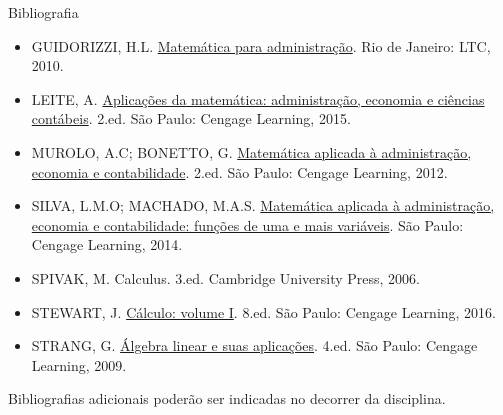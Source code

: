 \documentclass[10pt]{beamer}
\begin{document}
\begin{frame}{Bibliografia }
    \begin{itemize}
        \item GUIDORIZZI, H.L. \href{https://app.minhabiblioteca.com.br/reader/books/978-85-216-2778-4}{Matemática para administração}. Rio de Janeiro: LTC, 2010.
        \item LEITE, A. \href{https://app.minhabiblioteca.com.br/reader/books/9788522122707}{Aplicações da matemática: administração, economia e ciências contábeis}. 2.ed. São Paulo: Cengage Learning, 2015.
        \item MUROLO, A.C; BONETTO, G. \href{https://app.minhabiblioteca.com.br/reader/books/9788522113392}{Matemática aplicada à administração, economia e contabilidade}. 2.ed. São Paulo: Cengage Learning, 2012. %
        \item SILVA, L.M.O; MACHADO, M.A.S. \href{https://app.minhabiblioteca.com.br/reader/books/9788522126576}{Matemática aplicada à administração, economia e contabilidade: funções de uma e mais variáveis}. São Paulo: Cengage Learning, 2014. %
        \item SPIVAK, M. Calculus. 3.ed. Cambridge University Press, 2006.
        \item STEWART, J. \href{https://app.minhabiblioteca.com.br/reader/books/9788522126859}{Cálculo: volume I}. 8.ed. São Paulo: Cengage Learning, 2016. %
        \item STRANG, G. \href{https://app.minhabiblioteca.com.br/reader/books/9788522118021}{Álgebra linear e suas aplicações}. 4.ed. São Paulo: Cengage Learning, 2009. \bigskip %
    \end{itemize}
     Bibliografias adicionais poderão ser indicadas no decorrer da disciplina.
\end{frame}
\end{document}
